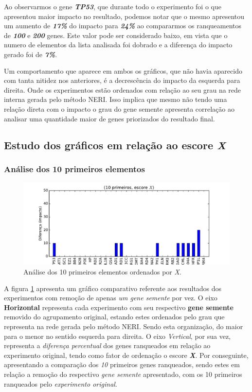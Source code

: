 %
Ao observarmos o gene \textbf{\textit{TP53}}, que durante todo o experimento foi o que apresentou maior impacto no resultado, podemos notar que o mesmo apresentou um aumento de \textbf{\textit{17\%}} do impacto para \textbf{\textit{24\%}} ao compararmos os ranqueamentos de \textbf{\textit{100}} e \textbf{\textit{200}} genes. Este valor pode ser considerado baixo, em vista que o numero de elementos da lista analisada foi dobrado e a diferença do impacto gerado foi de \textbf{\textit{7\%}}.

% 
Um comportamento que aparece em ambos os gráficos, que não havia aparecido com tanta nitidez nos anteriores, é a decrescência do impacto da esquerda para direita. Onde os experimentos estão ordenados com relação ao seu grau na rede interna gerada pelo método NERI. Isso implica que mesmo não tendo uma relação direta com o impacto o grau do gene semente apresenta correlação ao analisar uma quantidade maior de genes priorizados do resultado final.

%
%
%
%
\subsection{Estudo dos gráficos em relação ao escore \textit{X}}
%
\subsubsection{Análise dos 10 primeiros elementos}
%
\begin{figure}[ht!]
\centering
\includegraphics[width=\textwidth]{Images/analyses/fig_LOO_X_10.pdf}
\caption {Análise dos 10 primeiros elementos ordenados por \textit{X}.
\label{fig_LOO_X_10}}
\end{figure}
%

%
A figura \ref{fig_LOO_X_10} apresenta um gráfico comparativo referente aos resultados dos experimentos com remoção de apenas \textsl{um gene semente} por vez. O eixo \textbf{Horizontal} representa cada experimento com seu respectivo \textbf{gene semente} removido do agrupamento original, estando estes ordenados  pelo grau que representa na rede gerada pelo método NERI. Sendo esta organização, do maior para o menor no sentido esquerda para direita. O eixo \textsl{Vertical}, por sua vez, representa a \textsl{diferença percentual} dos genes ranqueados em relação ao experimento original, tendo como fator de ordenação o escore \textsl{\textbf{X}}. Por conseguinte, apresentando a comparação dos \textsl{10} primeiros genes ranqueados, sendo estes em relação a remoção do respectivo \textsl{gene semente} apresentado, com os 10 primeiros ranqueados pelo \textsl{experimento original}.
%

